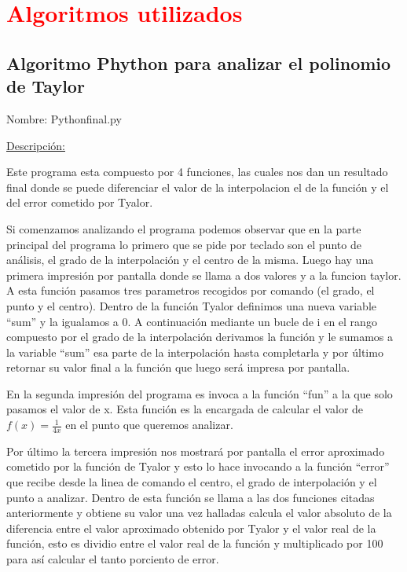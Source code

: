 \documentclass[a4paper,12pt]{article}
\begin{document}
\section{\textcolor{red}{Algoritmos utilizados}}
\subsection{Algoritmo Phython para analizar el polinomio de Taylor}

 Nombre: Pythonfinal.py
 
 

\underline{Descripción:}

Este programa esta compuesto por 4 funciones, las cuales nos dan un resultado final donde se puede diferenciar el valor de la interpolacion el de la función y el del 
error cometido por Tyalor.

Si comenzamos analizando el programa podemos observar que en la parte principal del programa lo primero que se pide por teclado son el punto de análisis, el grado de la interpolación
y el centro de la misma. Luego hay una primera impresión por pantalla donde se llama a dos valores y a la funcion taylor. A esta función pasamos tres parametros recogidos 
por comando (el grado, el punto y el centro). Dentro de la función Tyalor definimos una nueva variable ``sum'' y la igualamos a 0. A continuación mediante un bucle de i en 
el rango compuesto por el grado de la interpolación derivamos la función y le sumamos a la variable ``sum'' esa parte de la interpolación hasta completarla y por último retornar
su valor final a la función que luego será impresa por pantalla.

En la segunda impresión del programa es invoca a la función ``fun'' a la que solo pasamos el valor de x. Esta función es la encargada de calcular 
el valor de $f(x)=\frac{1}{4x}$ en el punto que queremos analizar.
  
Por último la tercera impresión nos mostrará por pantalla el error aproximado cometido por la función de Tyalor y esto lo hace invocando a la función ``error'' que recibe
desde la linea de comando el centro, el grado de interpolación y el punto a analizar. Dentro de esta función se llama a las dos funciones citadas anteriormente y obtiene su valor
una vez halladas calcula el valor absoluto de la diferencia entre el valor aproximado obtenido por Tyalor y el valor real de la función, esto es dividio entre el valor real
de la función y multiplicado por 100 para así calcular el tanto porciento de error. 
\end{document}
